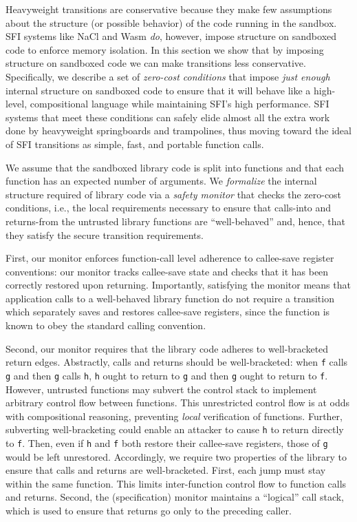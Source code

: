 Heavyweight transitions are conservative because they make few assumptions
about the structure (or possible behavior) of the code running in the sandbox.
%
SFI systems like NaCl and Wasm \emph{do}, however, impose structure on
sandboxed code to enforce memory isolation.
%
In this section we show that by imposing structure on sandboxed code we can
make transitions less conservative.
%
Specifically, we describe a set of \emph{zero-cost conditions}
that impose \emph{just enough} internal structure on sandboxed code to ensure
that it will behave like a high-level, compositional language while maintaining
SFI's high performance.
%
SFI systems that meet these conditions can safely elide almost all the extra
work done by heavyweight springboards and trampolines, thus moving toward the
ideal of SFI transitions as simple, fast, and portable function calls.

%
We assume that the sandboxed library code is split into functions and that each
function has an expected number of arguments.
%
We \emph{formalize} the internal structure required of library code via a
\emph{safety monitor} that checks the zero-cost conditions, i.e., the local
requirements necessary to ensure that calls-into and returns-from the untrusted
library functions are ``well-behaved'' and, hence, that they satisfy the secure
transition requirements.

%
First, our monitor enforces function-call level adherence to callee-save
register conventions: our monitor tracks callee-save state and checks that it
has been correctly restored upon returning.
%
Importantly, satisfying the monitor means that application calls to a
well-behaved library function do not require a transition which separately saves
and restores callee-save registers, since the function is known to obey the
standard calling convention.

%
Second, our monitor requires that the library code adheres to well-bracketed
return edges.
%
Abstractly, calls and returns should be well-bracketed: when \verb+f+ calls
\verb+g+ and then \verb+g+ calls \verb+h+, \verb+h+ ought to return to \verb+g+
and then \verb+g+ ought to return to \verb+f+.
%
However, untrusted functions may subvert the control stack to implement
arbitrary control flow between functions.
%
This unrestricted control flow is at odds with compositional reasoning,
preventing \emph{local} verification of functions.
%
Further, subverting well-bracketing could enable an attacker to cause \verb+h+
to return directly to \verb+f+.
%
Then, even if \verb+h+ and \verb+f+ both restore their callee-save registers,
those of \verb+g+ would be left unrestored.
%
Accordingly, we require two properties of the library to ensure that calls and
returns are well-bracketed.
%
First, each jump must stay within the same function.
%
This limits inter-function control flow to function calls and returns.
%
Second, the (specification) monitor maintains a ``logical'' call stack, 
which is used to ensure that returns go only to the preceding caller.


